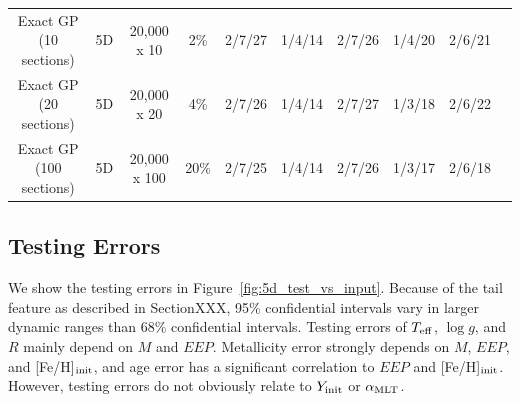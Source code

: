 \begin{table}
\begin{tabular}{cccccccccc}
		 Exact GP (10 sections) & 5D& 20,000 x 10 & 2\% & 2/7/27  & 1/4/14 & 2/7/26 &1/4/20 & 2/6/21\\
		 Exact GP (20 sections) & 5D& 20,000 x 20 & 4\% & 2/7/26  & 1/4/14 & 2/7/27 &1/3/18 & 2/6/22 \\
		  Exact GP (100 sections) & 5D& 20,000 x 100 & 20\% & 2/7/25  & 1/4/14 & 2/7/26 &1/3/17 & 2/6/18 \\
		  \hline
	\end{tabular}
\end{table}

\subsection{Testing Errors}

We show the testing errors in Figure~\ref{fig:5d_test_vs_input}. 
%
Because of the tail feature as described in SectionXXX, 95\% confidential intervals vary in larger dynamic ranges than 68\% confidential intervals.  
%
Testing errors of $T_{\rm eff}$, $\log g$, and $R$ mainly depend on $M$ and $EEP$. Metallicity error strongly depends on $M$, $EEP$, and [Fe/H]$_{\rm init}$, and age error has a significant correlation to $EEP$ and [Fe/H]$_{\rm init}$. However, testing errors do not obviously relate to $Y_{\rm init}$ or $\alpha_{\rm MLT}$. 

